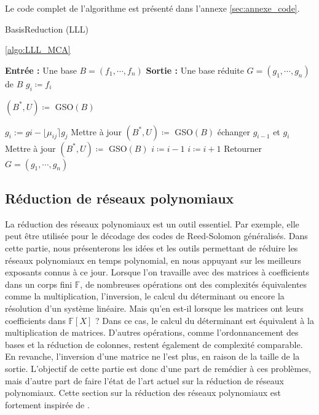 \documentclass[a4paper,12pt]{report}  %
\theoremstyle{definitionstyle}
\theoremstyle{examplestyle}
\theoremstyle{remarkstyle}
\theoremstyle{propositionstyle}
\theoremstyle{theoremstyle}
\theoremstyle{proofstyle}
\begin{document}
	Le code complet de l'algorithme est présenté dans l'annexe \ref{sec:annexe_code}.
	\begin{algorithm}
		\caption{BasisReduction (LLL) \cite{MCA}}
		\label{algo:LLL_MCA} 
		\ref{algo:LLL_MCA}
			
		\begin{algorithmic}[1]
			\State \textbf{Entrée :} Une base $B=(f_1, \cdots, f_n)$
			\State \textbf{Sortie :} Une base réduite $G=(g_1, \cdots, g_n)$ de $B$
				\State $g_i \coloneqq f_i$
			\EndFor
			
			\State $(B^*, U)\coloneqq$ GSO$(B)$
			
			\State $g_i:=gi-\lfloor \mu_{ij} \rceil g_j$
			\State Mettre à jour $(B^*, U)\coloneqq$ GSO$(B)$
			\EndFor
			\State échanger $g_{i-1}$ et $g_i$
			\State Mettre à jour $(B^*, U)\coloneqq$ GSO$(B)$
			\State $i \coloneqq i-1$ 
			\Else 
			\State $i \coloneqq i+1$
			\EndIf
			\EndWhile
			\State Retourner $G=(g_1, \cdots, g_n)$
		\end{algorithmic}
	\end{algorithm}
	
	\subsection{Réduction de réseaux polynomiaux}
	
	
	La réduction des réseaux polynomiaux est un outil essentiel. Par exemple, elle peut être utilisée pour le décodage des codes de Reed-Solomon généralisés. Dans cette partie, nous présenterons les idées et les outils permettant de réduire les réseaux polynomiaux en temps polynomial, en nous appuyant sur les meilleurs exposants connus à ce jour. Lorsque l'on travaille avec des matrices à coefficients dans un corps fini \(\mathbb{F}\), de nombreuses opérations ont des complexités équivalentes comme la multiplication, l'inversion, le calcul du déterminant ou encore la résolution d'un système linéaire. Mais qu'en est-il lorsque les matrices ont leurs coefficients dans \(\mathbb{F}[X]\) ? Dans ce cas, le calcul du déterminant est équivalent à la multiplication de matrices. D'autres opérations, comme l'ordonnancement des bases et la réduction de colonnes, restent également de complexité comparable. En revanche, l'inversion d'une matrice ne l'est plus, en raison de la taille de la sortie. L'objectif de cette partie est donc d'une part de remédier à ces problèmes, mais d'autre part de faire l'état de l'art actuel sur la réduction de réseaux polynomiaux. Cette section sur la réduction des réseaux polynomiaux est fortement inspirée de \cite{CCLebreton}. \\
	
\end{document}
